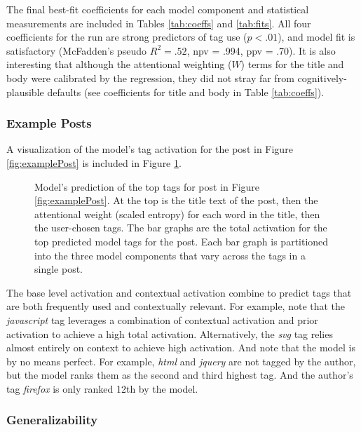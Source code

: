 \documentclass[10pt,letterpaper]{article}
\begin{document}
The final best-fit coefficients for each model component and statistical measurements are included in Tables \ref{tab:coeffs} and \ref{tab:fits}.
All four coefficients for the run are strong predictors of tag use ($p<.01$), and model fit is satisfactory (McFadden's pseudo $R_{}^{2}=.52$, npv = .994, ppv = .70).
It is also interesting that although the attentional weighting ($W$) terms for the title and body were calibrated by the regression, they did not stray far from cognitively-plausible defaults
(see coefficients for title and body in Table \ref{tab:coeffs}).

\subsubsection{Example Posts}

A visualization of the model's tag activation for the post in Figure \ref{fig:examplePost} is included in Figure \ref{fig:modelPost}.

\begin{figure}[ht]
  \centering
  \caption{
    Model's prediction of the top tags for post in Figure \ref{fig:examplePost}.
    At the top is the title text of the post, then the attentional weight (scaled entropy) for each word in the title, then the user-chosen tags.
    The bar graphs are the total activation for the top predicted model tags for the post.
    Each bar graph is partitioned into the three model components that vary across the tags in a single post.
}
  \label{fig:modelPost}
\end{figure}

The base level activation and contextual activation combine to predict tags that are both frequently used and contextually relevant.
For example, note that the \emph{javascript} tag leverages a combination of contextual activation and prior activation to achieve a high total activation.
Alternatively, the \emph{svg} tag relies almost entirely on context to achieve high activation.
And note that the model is by no means perfect.
For example, \emph{html} and \emph{jquery} are not tagged by the author, but the model ranks them as the second and third highest tag.
And the author's tag \emph{firefox} is only ranked 12th by the model.

\subsubsection{Generalizability}
\end{document}
